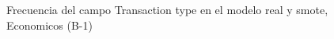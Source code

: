 \begin{figure}[H]
    \centering
    
    \caption{Frecuencia del campo Transaction type en el modelo real y smote, Economicos (B-1)}
    \label{frecuency-Transaction Type-smote-enc}
\end{figure}